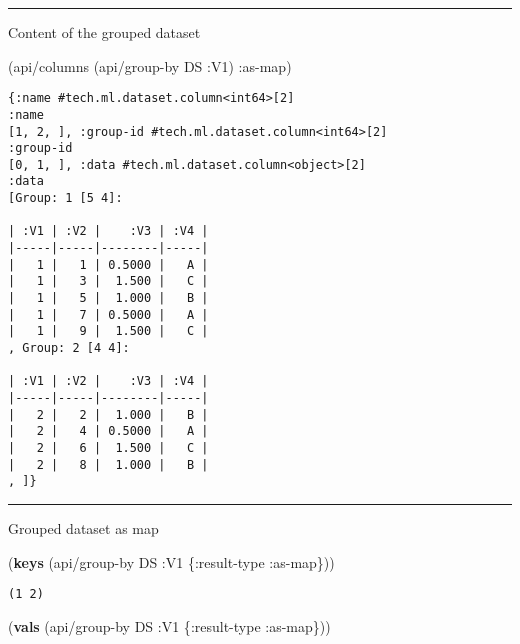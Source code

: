 \documentclass[]{article}
\newenvironment{Shaded}{\begin{snugshade}}{\end{snugshade}}
\newcommand{\KeywordTok}[1]{\textcolor[rgb]{0.13,0.29,0.53}{\textbf{#1}}}
\newcommand{\AttributeTok}[1]{\textcolor[rgb]{0.77,0.63,0.00}{#1}}
\newcommand{\NormalTok}[1]{#1}
\begin{document}
\begin{center}\rule{0.5\linewidth}{0.5pt}\end{center}

Content of the grouped dataset

\begin{Shaded}
\begin{Highlighting}[]
\NormalTok{(api/columns (api/group-by DS }\AttributeTok{:V1}\NormalTok{) }\AttributeTok{:as-map}\NormalTok{)}
\end{Highlighting}
\end{Shaded}

\begin{verbatim}
{:name #tech.ml.dataset.column<int64>[2]
:name
[1, 2, ], :group-id #tech.ml.dataset.column<int64>[2]
:group-id
[0, 1, ], :data #tech.ml.dataset.column<object>[2]
:data
[Group: 1 [5 4]:

| :V1 | :V2 |    :V3 | :V4 |
|-----|-----|--------|-----|
|   1 |   1 | 0.5000 |   A |
|   1 |   3 |  1.500 |   C |
|   1 |   5 |  1.000 |   B |
|   1 |   7 | 0.5000 |   A |
|   1 |   9 |  1.500 |   C |
, Group: 2 [4 4]:

| :V1 | :V2 |    :V3 | :V4 |
|-----|-----|--------|-----|
|   2 |   2 |  1.000 |   B |
|   2 |   4 | 0.5000 |   A |
|   2 |   6 |  1.500 |   C |
|   2 |   8 |  1.000 |   B |
, ]}
\end{verbatim}

\begin{center}\rule{0.5\linewidth}{0.5pt}\end{center}

Grouped dataset as map

\begin{Shaded}
\begin{Highlighting}[]
\NormalTok{(}\KeywordTok{keys}\NormalTok{ (api/group-by DS }\AttributeTok{:V1}\NormalTok{ \{}\AttributeTok{:result-type} \AttributeTok{:as-map}\NormalTok{\}))}
\end{Highlighting}
\end{Shaded}

\begin{verbatim}
(1 2)
\end{verbatim}

\begin{Shaded}
\begin{Highlighting}[]
\NormalTok{(}\KeywordTok{vals}\NormalTok{ (api/group-by DS }\AttributeTok{:V1}\NormalTok{ \{}\AttributeTok{:result-type} \AttributeTok{:as-map}\NormalTok{\}))}
\end{Highlighting}
\end{Shaded}
\end{document}

